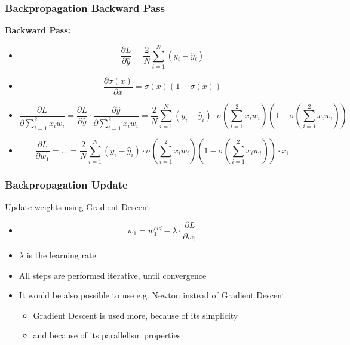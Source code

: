   \begin{frame}
   \frametitle{Backpropagation Backward Pass}
   
   \textbf{Backward Pass:}
   
   \begin{itemize}
    \item<2->{
    \begin{equation}
     \frac{\partial L}{\partial \hat{y}} = \frac{2}{N}\sum_{i=1}^N(y_i-\hat{y}_i)
    \end{equation}        
    }
    \item<3->{
    \begin{equation}
     \frac{\partial \sigma(x)}{\partial x} = \sigma(x)(1-\sigma(x))
    \end{equation}        
    }
    \item<4->{
    \begin{equation}
     \frac{\partial L}{\partial \sum_{i=1}^{2}x_iw_i} = \frac{\partial L}{\partial \hat{y}} \cdot \frac{\partial \hat{y}}{\partial \sum_{i=1}^{2}x_iw_i} = 
     \frac{2}{N}\sum_{i=1}^{N}(y_i-\hat{y}_i) \cdot \sigma(\sum_{i=1}^{2}x_iw_i)(1-\sigma(\sum_{i=1}^{2}x_iw_i))
    \end{equation}        
    }
    \item<5->{
    \begin{equation}
     \frac{\partial L}{\partial w_1} = \ldots = \frac{2}{N}\sum_{i=1}^{N}(y_i-\hat{y}_i) \cdot \sigma(\sum_{i=1}^{2}x_iw_i)(1-\sigma(\sum_{i=1}^{2}x_iw_i)) \cdot 
     x_1
    \end{equation}        
    }
   \end{itemize}
  
  \end{frame}
  \begin{frame}
   \frametitle{Backpropagation Update}
   
    Update weights using Gradient Descent
   
   \begin{itemize}
    \item<2->{
    \begin{equation}
     w_1 = w_1^{old} - \lambda \cdot \frac{\partial L}{\partial w_1}
    \end{equation}        
    }
    \item<3-> $\lambda$ is the learning rate
    \item<4-> All steps are performed iterative, until convergence
    \item<5-> It would be also possible to use e.g. Newton instead of Gradient Descent
    \begin{itemize}
     \item<6-> Gradient Descent is used more, because of its simplicity
     \item<7-> and because of its parallelism properties \cite{Rumelhart1986}
    \end{itemize}
   \end{itemize}
  
  \end{frame}

